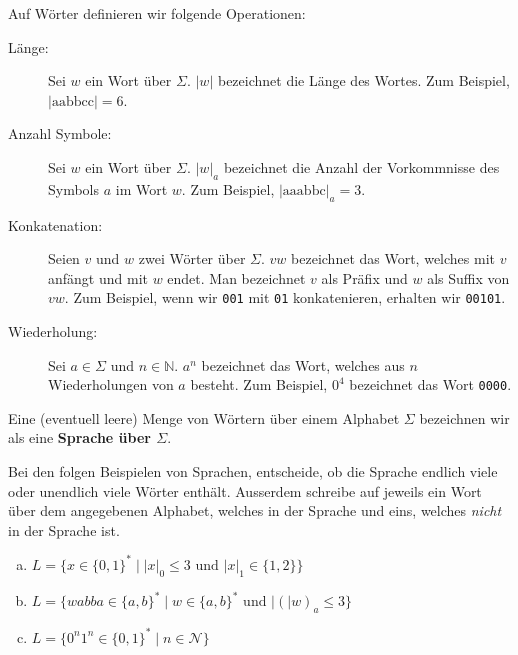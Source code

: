 \documentclass{article}
\newcommand{\abs}[1]{\lvert#1\rvert}
\begin{document}
\begin{definition}
Auf Wörter definieren wir folgende Operationen:
\begin{description}
    \item[Länge:] Sei \(w\) ein Wort über \(\Sigma\). \(\abs{w}\) bezeichnet die Länge des Wortes. Zum Beispiel, \(\abs{\text{aabbcc}}=6\).
    \item[Anzahl Symbole:] Sei \(w\) ein Wort über \(\Sigma\). \(\abs{w}_a\) bezeichnet die Anzahl der Vorkommnisse des Symbols \(a\) im Wort \(w\). Zum Beispiel, \(\abs{\text{aaabbc}}_a=3\).
    \item[Konkatenation:] Seien \(v\) und \(w\) zwei Wörter über \(\Sigma\). \(vw\) bezeichnet das Wort, welches mit \(v\) anfängt und mit \(w\) endet. Man bezeichnet \(v\) als Präfix und \(w\) als Suffix von \(vw\). Zum Beispiel, wenn wir \texttt{001} mit \texttt{01} konkatenieren, erhalten wir \texttt{00101}.
    \item[Wiederholung:] Sei \(a \in \Sigma\) und \(n \in \mathbb{N}\). \(a^n\) bezeichnet das Wort, welches aus \(n\) Wiederholungen von \(a\) besteht. Zum Beispiel, \(\text{0}^4\) bezeichnet das Wort \texttt{0000}.
\end{description}
\end{definition}

\begin{definition}
Eine (eventuell leere) Menge von Wörtern über einem Alphabet \(\Sigma\) bezeichnen wir als eine \textbf{Sprache über \(\Sigma\)}. 
\end{definition}

\begin{exercise}
Bei den folgen Beispielen von Sprachen, entscheide, ob die Sprache endlich viele oder unendlich viele Wörter enthält. Ausserdem schreibe auf jeweils ein Wort über dem angegebenen Alphabet, welches in der Sprache und eins, welches \emph{nicht} in der Sprache ist.

{
\begin{enumerate}[(a)]
    \item \(L = \{x \in \{0,1\}^* \mid \abs{x}_0 \leq 3 \text{ und } \abs{x}_1 \in \{1,2\}\}\) \\
    \blank[width=\linewidth]{}

    \item \(L = \{wabba \in \{a,b\}^* \mid w \in \{a, b\}^* \text{ und } \abs(w)_a \leq 3\}\) \\
    \blank[width=\linewidth]{}
    
    \item \(L = \{0^n 1^n \in \{0, 1\}^* \mid n \in \mathcal{N}\}\) \\
    \blank[width=\linewidth]{}
\end{enumerate}
}
\end{exercise}
\end{document}
